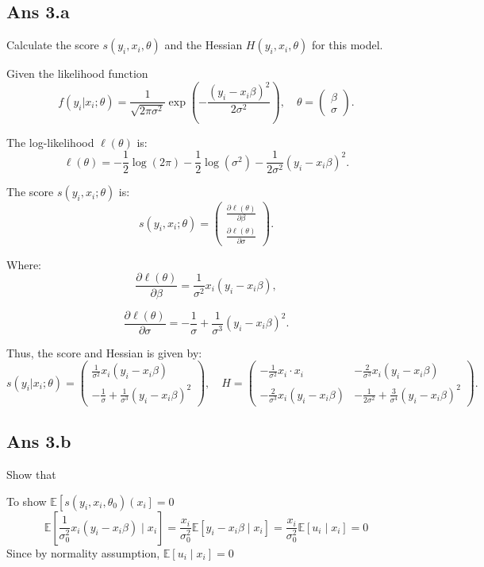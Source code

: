 \documentclass{article}
\begin{document}
\subsection*{Ans 3.a } Calculate the score \( s(y_i, x_i, \theta) \) and the Hessian \( H(y_i, x_i, \theta) \) for this model.

Given the likelihood function
\[
f(y_i | x_i; \theta) = \frac{1}{\sqrt{2\pi\sigma^2}} \exp \left( -\frac{(y_i - x_i\beta)^2}{2\sigma^2} \right), \quad \theta = \begin{pmatrix} \beta \\ \sigma \end{pmatrix}.
\]

The log-likelihood \(\ell(\theta)\) is:
\[
\ell(\theta) = -\frac{1}{2}\log(2\pi) - \frac{1}{2}\log(\sigma^2) - \frac{1}{2\sigma^2}(y_i - x_i\beta)^2.
\]

The score \(s(y_i, x_i; \theta)\) is:
\[
s(y_i, x_i; \theta) = \begin{pmatrix}
\frac{\partial \ell(\theta)}{\partial \beta} \\
\frac{\partial \ell(\theta)}{\partial \sigma}
\end{pmatrix}.
\]

Where:
\[
\frac{\partial \ell(\theta)}{\partial \beta} = \frac{1}{\sigma^2} x_i(y_i - x_i\beta),
\]

\[
\frac{\partial \ell(\theta)}{\partial \sigma} = -\frac{1}{\sigma} + \frac{1}{\sigma^3} (y_i - x_i\beta)^2.
\]

Thus, the score and Hessian is given by:
\[
s(y_i | x_i; \theta) = \begin{pmatrix}
\frac{1}{\sigma^2} x_i(y_i - x_i\beta) \\
-\frac{1}{\sigma} + \frac{1}{\sigma^3} (y_i - x_i\beta)^2
\end{pmatrix},  \quad H =\begin{pmatrix}
-\frac{1}{\sigma^2} x_i\cdot x_i & -\frac{2}{\sigma^3}x_i(y_i - x_i\beta) \\
-\frac{2}{\sigma^3}x_i(y_i - x_i\beta) & -\frac{1}{2\sigma^2} + \frac{3}{\sigma^4}(y_i - x_i\beta)^2
\end{pmatrix}.
\]

\subsection*{Ans 3.b } Show that

To show $\mathbb{E}\left[s\left(y_i, x_i, \theta_0\right)\left(x_i\right]=0\right.$
$$
\mathbb{E}\left[\frac{1}{\sigma_0^2} x_i\left(y_i-x_i \beta\right) \mid x_i\right]=\frac{x_i}{\sigma_0^2} \mathbb{E}\left[y_i-x_i\beta \mid x_i\right]= \frac{x_i}{\sigma_0^2} \mathbb{E}\left[u_i \mid x_i\right]=0
$$
Since by normality assumption, $\mathbb{E}\left[u_i \mid x_i\right]=0$
\end{document}

